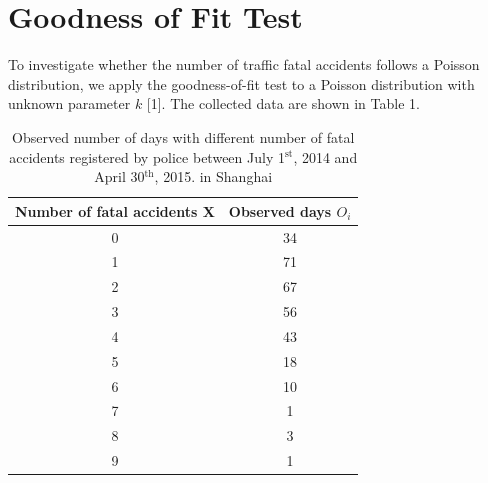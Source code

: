 \documentclass[a4paper,12pt]{article}
\begin{document}
 \section{Goodness of Fit Test}
\noindent To investigate whether the number of traffic fatal accidents follows a Poisson distribution, we apply the goodness-of-fit test to a Poisson distribution with unknown parameter $k$ [1]. The collected data are shown in Table 1.
\newpage
\begin{table}[hbp]
\centering
\begin{tabular}{|c|c|}
\hline
Number of fatal accidents X&Observed days $O_i$\\
\hline
0	&34\\
\hline
1	&71\\
\hline
2	&67\\
\hline
3	&56\\
\hline
4	&43\\
\hline
5	&18\\
\hline
6	&10\\
\hline
7	&1\\
\hline
8	&3\\
\hline
9	&1\\
\hline
\end{tabular}
\caption{Observed number of days with different number of fatal accidents registered by police between  July 1$^{\text{st}}$, 2014 and April 30$^{\text{th}}$, 2015. in Shanghai}
\end{table}
\end{document}
